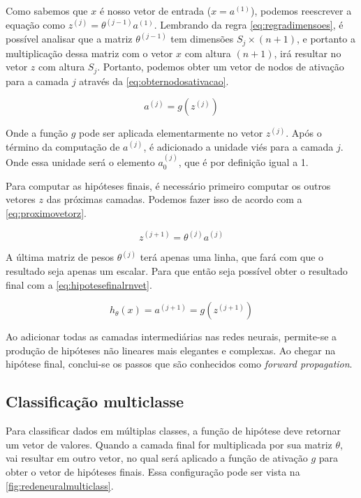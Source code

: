 Como sabemos que $x$ é nosso vetor de entrada ($x = a^{(1)}$), podemos reescrever a equação como $z^{(j)} = \theta^{(j-1)}a^{(1)}$. Lembrando da regra \ref{eq:regradimensoes}, é possível analisar que a matriz  $\theta^{(j-1)}$ tem dimensões $S_j \times (n+1)$, e portanto a multiplicação dessa matriz com o vetor $x$ com altura $(n+1)$, irá resultar no vetor $z$ com altura $S_j$. Portanto, podemos obter um vetor de nodos de ativação para a camada $j$ através da \autoref{eq:obternodosativacao}.

\begin{equation} \label{eq:obternodosativacao}
a^{(j)} = g(z^{(j)}) 
\end{equation}

Onde a função $g$ pode ser aplicada elementarmente no vetor $z^{(j)}$. Após o término da computação de $a^{(j)}$, é adicionado a unidade viés para a camada $j$. Onde essa unidade será o elemento $a_0^{(j)}$, que é por definição igual a 1.

Para computar as hipóteses finais, é necessário primeiro computar os outros vetores $z$ das próximas camadas. Podemos fazer isso de acordo com a \autoref{eq:proximovetorz}.

\begin{equation} \label{eq:proximovetorz}
z^{(j+1)} =  \theta^{(j)}a^{(j)}
\end{equation}

A última matriz de pesos $\theta^{(j)}$ terá apenas uma linha, que fará com que o resultado seja apenas um escalar. Para que então seja possível obter o resultado final com a \autoref{eq:hipotesefinalrnvet}.

\begin{equation} \label{eq:hipotesefinalrnvet}
h_{\theta}(x) = a^{(j+1)} = g(z^{(j+1)})
\end{equation}

Ao adicionar todas as camadas intermediárias nas redes neurais, permite-se a produção de hipóteses não lineares mais elegantes e complexas. Ao chegar na hipótese final, conclui-se os passos que são conhecidos como \textit{forward propagation}.


\subsection{Classificação multiclasse}\label{subsec:clasmultirn}

Para classificar dados em múltiplas classes, a função de hipótese deve retornar um vetor de valores. Quando a camada final for multiplicada por sua matriz $\theta$, vai resultar em outro vetor, no qual será aplicado a função de ativação $g$ para obter o vetor de hipóteses finais. Essa configuração pode ser vista na \autoref{fig:redeneuralmulticlass}.

